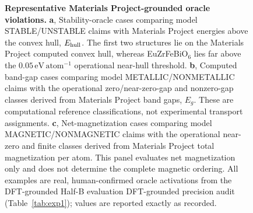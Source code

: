 \documentclass[pdflatex,sn-nature]{sn-jnl}
\newcommand{\rev}[1]{#1} %
\newcommand{\rev}[1]{{\color{blue}#1}} %
\providecommand{\DIFadd}[1]{{\protect\color{blue} \sf #1}} %
\providecommand{\DIFdel}[1]{{\protect\color{red} \scriptsize #1}} %
\providecommand{\DIFaddFL}[1]{\DIFadd{#1}} %
\providecommand{\DIFdelFL}[1]{\DIFdel{#1}} %
\providecommand{\DIFaddbeginFL}{} %
\providecommand{\DIFaddendFL}{} %
\providecommand{\DIFdelbeginFL}{} %
\providecommand{\DIFdelendFL}{} %
\providecommand{\DIFscaledelfig}{0.5}
\newlength{\DIFdelgraphicswidth} %
\newlength{\DIFdelgraphicsheight} %
\providecommand{\DIFaddincludegraphics}[2][]{{\color{blue}\fbox{\DIFOincludegraphics[#1]{#2}}}} %
\providecommand{\DIFdelincludegraphics}[2][]{%
\sbox{\DIFdelgraphicsbox}{\DIFOincludegraphics[#1]{#2}}%
\settoboxwidth{\DIFdelgraphicswidth}{\DIFdelgraphicsbox} %
\settoboxtotalheight{\DIFdelgraphicsheight}{\DIFdelgraphicsbox} %
\scalebox{\DIFscaledelfig}{%
\parbox[b]{\DIFdelgraphicswidth}{\usebox{\DIFdelgraphicsbox}\\[-\baselineskip] \rule{\DIFdelgraphicswidth}{0em}}\llap{\resizebox{\DIFdelgraphicswidth}{\DIFdelgraphicsheight}{%
\setlength{\unitlength}{\DIFdelgraphicswidth}%
\begin{picture}(1,1)%
\thicklines\linethickness{2pt} %
{\color[rgb]{1,0,0}\put(0,0){\framebox(1,1){}}}%
{\color[rgb]{1,0,0}\put(0,0){\line( 1,1){1}}}%
{\color[rgb]{1,0,0}\put(0,1){\line(1,-1){1}}}%
\end{picture}%
}\hspace*{3pt}}} %
} %
\DeclareRobustCommand{\DIFaddbeginFL}{\DIFOaddbeginFL \let\includegraphics\DIFaddincludegraphics} %
\DeclareRobustCommand{\DIFaddendFL}{\DIFOaddendFL \let\includegraphics\DIFOincludegraphics} %
\DeclareRobustCommand{\DIFdelbeginFL}{\DIFOdelbeginFL \let\includegraphics\DIFdelincludegraphics} %
\DeclareRobustCommand{\DIFdelendFL}{\DIFOaddendFL \let\includegraphics\DIFOincludegraphics} %
\begin{document}
\begin{figure}[!htbp]

\caption{\justifying\textbf{Representative Materials Project-grounded oracle
violations.}
\textbf{a}, Stability-oracle cases comparing model STABLE/UNSTABLE claims with
Materials Project energies above the convex hull, $E_{\rm hull}$. The first two
structures lie on the Materials Project computed convex hull, whereas
EuZrFeBiO$_6$ lies far above the
$0.05\,\mathrm{eV\,atom^{-1}}$ operational near-hull threshold.
\textbf{b}, Computed band-gap cases comparing model METALLIC/NONMETALLIC claims
with the operational zero/near-zero-gap and nonzero-gap classes derived from
Materials Project band gaps, $E_g$. These are computational reference
classifications, not experimental transport assignments.
\textbf{c}, Net-magnetization cases comparing model MAGNETIC/NONMAGNETIC claims
with the operational near-zero and finite classes derived from Materials Project
total magnetization per atom. This panel evaluates net magnetization only and
does not determine the complete magnetic ordering. All examples are real,
human-confirmed oracle activations from the \DIFdelbeginFL \DIFdelFL{DFT-grounded Half-B evaluation}\DIFdelendFL \DIFaddbeginFL \DIFaddFL{\rev{DFT-grounded precision audit (Table~\ref{tab:exp1})}}\DIFaddendFL ;
values are reported exactly as recorded.}
\label{fig:dft-oracle-cases}
\end{figure}
\end{document}
